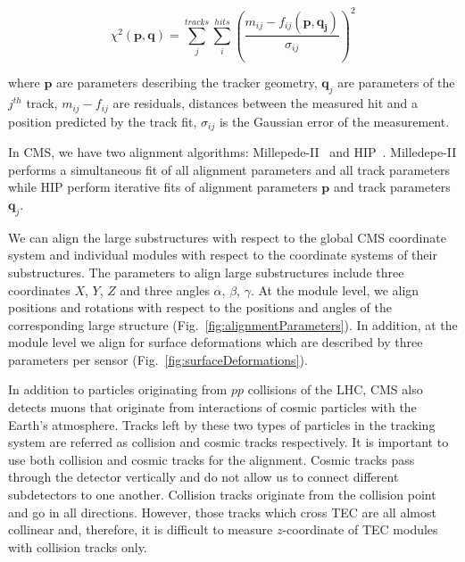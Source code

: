 \begin{equation}
  \chi^2(\mathbf{p},\mathbf{q})=\sum_j^{tracks} \sum_i^{hits} \left( {\frac{m_{ij}-f_{ij}(\mathbf{p},\mathbf{q_j})}{\sigma_{ij}}} \right)^2
\end{equation}

where $\mathbf{p}$ are parameters describing the tracker geometry, $\mathbf{q}_j$ are parameters of the $j^{th}$ track, $m_{ij}-f_{ij}$ are residuals, distances between the measured hit and a position predicted by the track fit, $\sigma_{ij}$ is the Gaussian error of the measurement.

In CMS, we have two alignment algorithms: Millepede-II~\cite{ref_MPII_Alg} and HIP~\cite{ref_HIP_Alg}. Milledepe-II performs a simultaneous fit of all alignment parameters and all track parameters while HIP perform iterative fits of alignment parameters $\mathbf{p}$ and track parameters $\mathbf{q}_j$.


We can align the large substructures with respect to the global CMS coordinate system and individual modules with respect to the coordinate systems of their substructures. The parameters to align large substructures include three coordinates $X$, $Y$, $Z$ and three angles $\alpha$, $\beta$, $\gamma$. At the module level, we align positions and rotations with respect to the positions and angles of the corresponding large structure (Fig.~\ref{fig:alignmentParameters}). In addition, at the module level we align for surface deformations which are described by three parameters per sensor (Fig.~\ref{fig:surfaceDeformations}). 

In addition to particles originating from $pp$ collisions of the LHC, CMS also detects muons that originate from interactions of cosmic particles with the Earth's atmosphere. Tracks left by these two types of particles in the tracking system are referred as collision and cosmic tracks respectively. It is important to use both collision and cosmic tracks for the alignment. Cosmic tracks pass through the detector vertically and do not allow us to connect different subdetectors to one another. Collision tracks originate from the collision point and go in all directions. However, those tracks which cross TEC are all almost collinear and, therefore, it is difficult to measure $z$-coordinate of TEC modules with collision tracks only.

